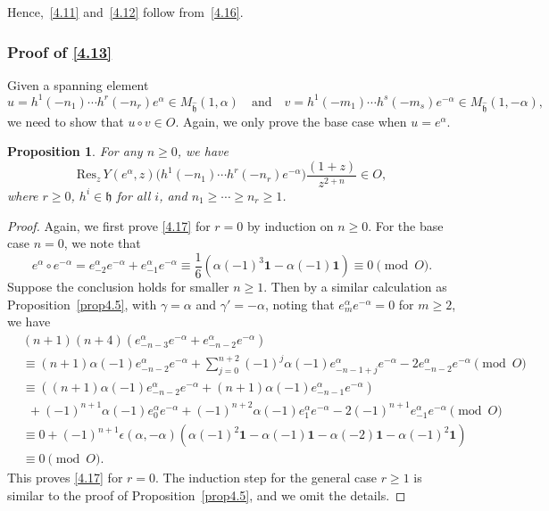 \documentclass[12pt,a4paper,reqno]{amsart}
\numberwithin{equation}{section}
\numberwithin{equation}{section}
\newtheorem{prop}[thm]{Proposition}
\theoremstyle{definition}
\def \al{\alpha}
\def \ga {\gamma}
\def \vac {\mathbf{1}}
\def \h {\mathfrak{h}}
\def\Res{\mathrm{Res}}
\begin{document}
	Hence,~\eqref{4.11} and~\eqref{4.12} follow from~\eqref{4.16}.
	
	
	\subsubsection{Proof of \eqref{4.13}} Given a spanning element 
	\[
	u = h^1(-n_1)\cdots h^r(-n_r)e^\alpha \in M_{\hat{\h}}(1,\alpha)
	\quad \text{and} \quad 
	v = h^1(-m_1)\cdots h^s(-m_s)e^{-\alpha} \in M_{\hat{\h}}(1,-\alpha),
	\]
	we need to show that $u\circ v\in O$. Again, we only prove the base case when $u=e^\alpha$.
	
	\begin{prop}\label{prop4.8}
		For any $n\geq 0$, we have 
		\begin{equation}\label{4.17}
			\Res_z\, Y(e^\alpha,z)
			\big(h^1(-n_1)\cdots h^r(-n_r)e^{-\alpha}\big)
			\frac{(1+z)}{z^{2+n}}
			\in O,
		\end{equation}
		where $r\geq 0$, $h^i\in \h$ for all $i$, and $n_1\geq \cdots \geq n_r\geq 1$.
	\end{prop}
	\begin{proof}
		Again, we first prove \eqref{4.17} for $r=0$ by induction on $n\geq 0$. For the base case $n=0$, we note that 
		$$e^\al\circ e^{-\al}=e^\al_{-2}e^{-\al}+e^\al_{-1}e^{-\al}\equiv \frac{1}{6}(\al(-1)^3\vac-\al(-1)\vac)\equiv 0\pmod{O}. $$
		Suppose the conclusion holds for smaller $n\geq 1$. 
		Then by a similar calculation as Proposition~\ref{prop4.5}, with $\ga=\al$ and $\ga'=-\al$, noting that $e^\al_me^{-\al}=0$ for $m\geq 2$, we have 
		\begin{align*}
			&(n+1)(n+4) \left(e^\al_{-n-3}e^{-\al}+e^\al_{-n-2}e^{-\al}\right)\\
			&\equiv (n+1) \al(-1)e^\al_{-n-2}e^{-\al}+\sum_{j= 0}^{n+2}(-1)^j \al(-1)e^\al_{-n-1+j}e^{-\al}-2e^\al_{-n-2}e^{-\al}\pmod{O}\\
			& \equiv ((n+1) \al(-1)e^\al_{-n-2}e^{-\al}+ (n+1)\al(-1)e^{\al}_{-n-1}e^{-\al})\\
			&\ \ + (-1)^{n+1}\al(-1)e^\al_0e^{-\al}+(-1)^{n+2}\al(-1)e^\al_{1}e^{-\al}-2(-1)^{n+1}e^\al_{-1}e^{-\al}\pmod{O}\\
			&\equiv 0+ (-1)^{n+1}\epsilon(\al,-\al)\left(\al(-1)^2\vac-\al(-1)\vac-\al(-2)\vac-\al(-1)^2\vac\right)\\
			&\equiv 0\pmod{O}.
		\end{align*}
		This proves \eqref{4.17} for $r=0$.  
		The induction step for the general case $r\geq 1$ is similar to the proof of Proposition~\ref{prop4.5}, and we omit the details.
	\end{proof}
	
\end{document}
